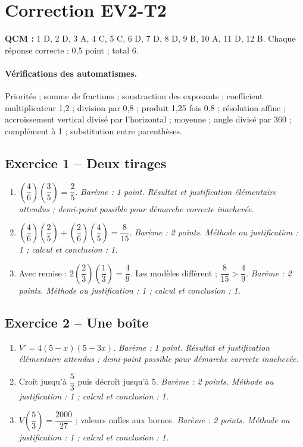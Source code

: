 \mxnewpage\section*{Correction EV2-T2}\label{EV2-T2-CORR}
\textbf{QCM :} 1 D, 2 D, 3 A, 4 C, 5 C, 6 D, 7 D, 8 D, 9 B, 10 A, 11 D, 12 B. Chaque réponse correcte : 0{,}5 point ; total 6.
\paragraph{Vérifications des automatismes.} Priorités ; somme de fractions ; soustraction des exposants ; coefficient multiplicateur 1{,}2 ; division par 0{,}8 ; produit 1{,}25 fois 0{,}8 ; résolution affine ; accroissement vertical divisé par l’horizontal ; moyenne ; angle divisé par 360 ; complément à 1 ; substitution entre parenthèses.
\subsection*{Exercice 1 -- Deux tirages}
\begin{enumerate}
\item $(\dfrac{4}{6})(\dfrac{3}{5})=\dfrac{2}{5}$. \textit{Barème : 1 point. Résultat et justification élémentaire attendus ; demi-point possible pour démarche correcte inachevée.}
\item $(\dfrac{4}{6})(\dfrac{2}{5})+(\dfrac{2}{6})(\dfrac{4}{5})=\dfrac{8}{15}$. \textit{Barème : 2 points. Méthode ou justification : 1 ; calcul et conclusion : 1.}
\item Avec remise : $2(\dfrac{2}{3})(\dfrac{1}{3})=\dfrac{4}{9}$. Les modèles diffèrent ; $\dfrac{8}{15}>\dfrac{4}{9}$. \textit{Barème : 2 points. Méthode ou justification : 1 ; calcul et conclusion : 1.}
\end{enumerate}
\subsection*{Exercice 2 -- Une boîte}
\begin{enumerate}
\item $V\prime=4(5-x)(5-3x)$. \textit{Barème : 1 point. Résultat et justification élémentaire attendus ; demi-point possible pour démarche correcte inachevée.}
\item Croît jusqu’à $\dfrac{5}{3}$ puis décroît jusqu’à 5. \textit{Barème : 2 points. Méthode ou justification : 1 ; calcul et conclusion : 1.}
\item $V(\dfrac{5}{3})=\dfrac{2000}{27}$ ; valeurs nulles aux bornes. \textit{Barème : 2 points. Méthode ou justification : 1 ; calcul et conclusion : 1.}
\end{enumerate}
